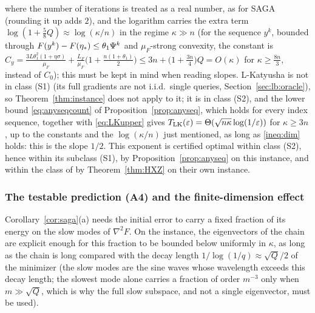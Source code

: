 where the number of iterations is treated as a real number, as for SAGA (rounding it up adds $2$), and the logarithm carries the extra term $\log(1+\frac58Q)\approx\log(\kappa/n)$ in the regime $\kappa\gg n$ (for the sequence $y^k$, bounded through $F(y^k)-F(\eta_\ast)\le\theta_1\Psi^k$ and $\mu_F$-strong convexity, the constant is $C_y=\frac{3L\theta_1^2(1+\eta\sigma)}{\mu_F}+\frac{L_F}{\mu_F}\big(1+\frac{n(1+\theta_1)}2\big)\le3n+\big(1+\frac{3n}4\big)Q=O(\kappa)$ for $\kappa\ge\frac{8n}3$, instead of $C_0$); this must be kept in mind when reading slopes. L-Katyusha is not in class (S1) (its full gradients are not i.i.d.\ single queries, Section~\ref{sec:lb:oracle}), so Theorem~\ref{thm:instance} does not apply to it; it is in class (S2), and the lower bound \eqref{eq:anyseqcount} of Proposition~\ref{prop:anyseq}, which holds for every index sequence, together with \eqref{eq:LKupper} gives $T_{\rm LK}(\varepsilon)=\Theta(\sqrt{n\kappa}\log(1/\varepsilon))$ for $\kappa\ge3n$, up to the constants and the $\log(\kappa/n)$ just mentioned, as long as \eqref{ineq:dim} holds: this is the slope $1/2$. This exponent is certified optimal within class (S2), hence within its subclass (S1), by Proposition~\ref{prop:anyseq} on this instance, and within the class of \cite{han2024lower} by Theorem~\ref{thm:HXZ} on their own instance.

\subsubsection{The testable prediction (A4) and the finite-dimension effect}

Corollary~\ref{cor:saga}(a) needs the initial error to carry a fixed fraction of its energy on the slow modes of $\nabla^2F$. On the instance, the eigenvectors of the chain are explicit enough for this fraction to be bounded below uniformly in $\kappa$, as long as the chain is long compared with the decay length $1/\log(1/q)\approx\sqrt Q/2$ of the minimizer (the slow modes are the sine waves whose wavelength exceeds this decay length; the slowest mode alone carries a fraction of order $m^{-3}$ only when $m\gg\sqrt Q$, which is why the full slow subspace, and not a single eigenvector, must be used).

